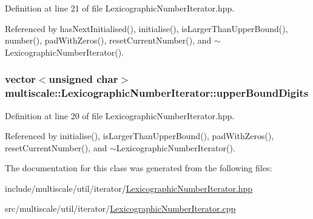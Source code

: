 Definition at line 21 of file Lexicographic\-Number\-Iterator.\-hpp.



Referenced by has\-Next\-Initialised(), initialise(), is\-Larger\-Than\-Upper\-Bound(), number(), pad\-With\-Zeros(), reset\-Current\-Number(), and $\sim$\-Lexicographic\-Number\-Iterator().

\hypertarget{classmultiscale_1_1LexicographicNumberIterator_a909a054ae4d3e79e5daa3059a94000d0}{
\subsubsection[{upper\-Bound\-Digits}]{\setlength{\rightskip}{0pt plus 5cm}vector$<$unsigned char$>$ multiscale\-::\-Lexicographic\-Number\-Iterator\-::upper\-Bound\-Digits\hspace{0.3cm}{\ttfamily [private]}}}\label{classmultiscale_1_1LexicographicNumberIterator_a909a054ae4d3e79e5daa3059a94000d0}


Definition at line 20 of file Lexicographic\-Number\-Iterator.\-hpp.



Referenced by initialise(), is\-Larger\-Than\-Upper\-Bound(), pad\-With\-Zeros(), reset\-Current\-Number(), and $\sim$\-Lexicographic\-Number\-Iterator().



The documentation for this class was generated from the following files\-:\begin{DoxyCompactItemize}
\item 
include/multiscale/util/iterator/\hyperlink{LexicographicNumberIterator_8hpp}{Lexicographic\-Number\-Iterator.\-hpp}\item 
src/multiscale/util/iterator/\hyperlink{LexicographicNumberIterator_8cpp}{Lexicographic\-Number\-Iterator.\-cpp}\end{DoxyCompactItemize}
